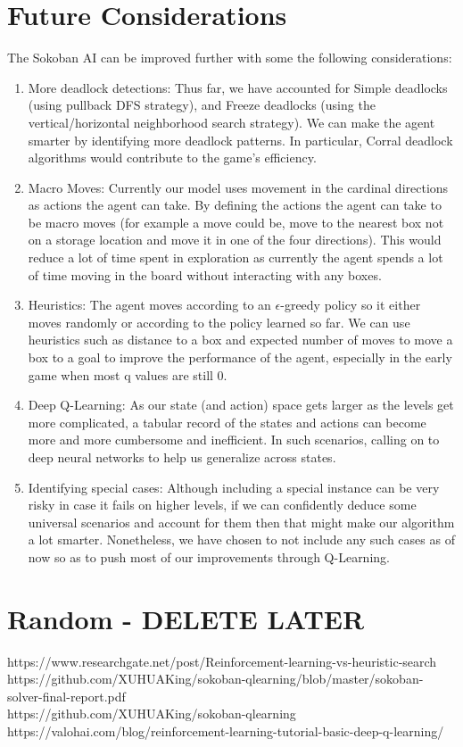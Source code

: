 \documentclass{article}
\begin{document}
\section{Future Considerations}
The Sokoban AI can be improved further with some the following considerations:
\begin{enumerate}
    \item More deadlock detections: Thus far, we have accounted for Simple deadlocks (using pullback DFS strategy), and Freeze deadlocks (using the vertical/horizontal neighborhood search strategy). We can make the agent smarter by identifying more deadlock patterns. In particular, Corral deadlock algorithms would contribute to the game's efficiency.
    \item Macro Moves: Currently our model uses movement in the cardinal directions as actions the agent can take. By defining the actions the agent can take to be macro moves (for example a move could be, move to the nearest box not on a storage location and move it in one of the four directions). This would reduce a lot of time spent in exploration as currently the agent spends a lot of time moving in the board without interacting with any boxes.
    \item Heuristics: The agent moves according to an $\epsilon$-greedy policy so it either moves randomly or according to the policy learned so far. We can use heuristics such as distance to a box and expected number of moves to move a box to a goal to improve the performance of the agent, especially in the early game when most q values are still $0$. 
    \item Deep Q-Learning: As our state (and action) space gets larger as the levels get more complicated, a tabular record of the states and actions can become more and more cumbersome and inefficient. In such scenarios, calling on to deep neural networks to help us generalize across states.
    \item Identifying special cases: Although including a special instance can be very risky in case it fails on higher levels, if we can confidently deduce some universal scenarios and account for them then that might make our algorithm a lot smarter. Nonetheless, we have chosen to not include any such cases as of now so as to push most of our improvements through Q-Learning. 
\end{enumerate}

\section{Random - DELETE LATER}
https://www.researchgate.net/post/Reinforcement-learning-vs-heuristic-search \\
https://github.com/XUHUAKing/sokoban-qlearning/blob/master/sokoban-solver-final-report.pdf \\
https://github.com/XUHUAKing/sokoban-qlearning \\
https://valohai.com/blog/reinforcement-learning-tutorial-basic-deep-q-learning/
\end{document}

